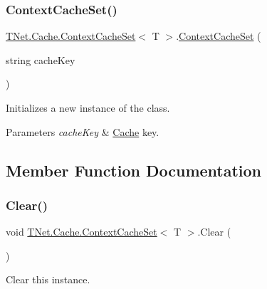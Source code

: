 \subsubsection{\texorpdfstring{Context\+Cache\+Set()}{ContextCacheSet()}}
{\footnotesize\ttfamily \mbox{\hyperlink{class_t_net_1_1_cache_1_1_context_cache_set}{T\+Net.\+Cache.\+Context\+Cache\+Set}}$<$ T $>$.\mbox{\hyperlink{class_t_net_1_1_cache_1_1_context_cache_set}{Context\+Cache\+Set}} (\begin{DoxyParamCaption}\item[{string}]{cache\+Key }\end{DoxyParamCaption})}



Initializes a new instance of the class. 


\begin{DoxyParams}{Parameters}
{\em cache\+Key} & \mbox{\hyperlink{namespace_t_net_1_1_cache}{Cache}} key.\\
\hline
\end{DoxyParams}


\subsection{Member Function Documentation}
\mbox{\label{class_t_net_1_1_cache_1_1_context_cache_set_a6b212212174d86c0322fb5c7ebbf2a19}} 
\subsubsection{\texorpdfstring{Clear()}{Clear()}}
{\footnotesize\ttfamily void \mbox{\hyperlink{class_t_net_1_1_cache_1_1_context_cache_set}{T\+Net.\+Cache.\+Context\+Cache\+Set}}$<$ T $>$.Clear (\begin{DoxyParamCaption}{ }\end{DoxyParamCaption})}



Clear this instance. 

\mbox{\label{class_t_net_1_1_cache_1_1_context_cache_set_ab9af16cc1243e8f1af74ad23577b5aea}} 
